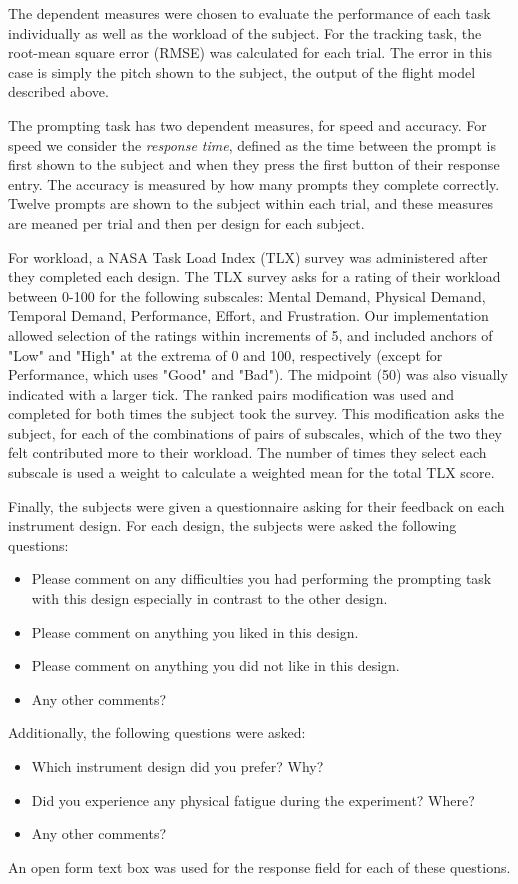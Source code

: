 The dependent measures were chosen to evaluate the performance of each task individually as well as the workload of the subject.
For the tracking task, the root-mean square error (RMSE) was calculated for each trial.
The error in this case is simply the pitch shown to the subject, the output of the flight model described above.

The prompting task has two dependent measures, for speed and accuracy.
For speed we consider the \textit{response time}, defined as the time between the prompt is first shown to the subject and when they press the first button of their response entry.
The accuracy is measured by how many prompts they complete correctly.
Twelve prompts are shown to the subject within each trial, and these measures are meaned per trial and then per design for each subject.

For workload, a NASA Task Load Index (TLX) survey was administered after they completed each design.
The TLX survey asks for a rating of their workload between 0-100 for the following subscales: Mental Demand, Physical Demand, Temporal Demand, Performance, Effort, and Frustration.
Our implementation allowed selection of the ratings within increments of 5, and included anchors of "Low" and "High" at the extrema of 0 and 100, respectively (except for Performance, which uses "Good" and "Bad").
The midpoint (50) was also visually indicated with a larger tick.
The ranked pairs modification was used and completed for both times the subject took the survey.
This modification asks the subject, for each of the combinations of pairs of subscales, which of the two they felt contributed more to their workload.
The number of times they select each subscale is used a weight to calculate a weighted mean for the total TLX score.

Finally, the subjects were given a questionnaire asking for their feedback on each instrument design.
For each design, the subjects were asked the following questions:
\begin{itemize}
    \item Please comment on any difficulties you had performing the prompting task with this design especially in contrast to the other design.
    \item Please comment on anything you liked in this design.
    \item Please comment on anything you did not like in this design.
    \item Any other comments?
\end{itemize}
Additionally, the following questions were asked:
\begin{itemize}
    \item Which instrument design did you prefer? Why?
    \item Did you experience any physical fatigue during the experiment? Where?
    \item Any other comments?
\end{itemize}
An open form text box was used for the response field for each of these questions.

